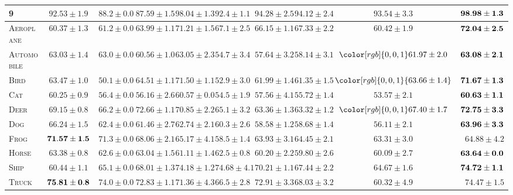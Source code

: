 \begin{table*}[!t]
{\begin{tabular}{lccccccccr}
   9 & $92.53\pm1.9$ & $88.2\pm0.0$ & $87.59\pm1.5$  & $98.04\pm1.3$ & $92.4\pm1.1$ & $94.28\pm2.5$     & $94.12\pm2.4$ & $93.54\pm3.3$ & $\bf{98.98\pm1.3}$\\
   \hline
  \textsc{Aeroplane}    & $60.37\pm1.3$ & $61.2\pm0.0$ & $63.99\pm1.1$  &$71.21\pm1.5$& $67.1\pm2.5$ & $66.15\pm1.1$ & $67.33\pm2.2$ & $60.42\pm1.9$  & $\bf{72.04\pm2.5}$\\
   \textsc{Automobile}  & $63.03\pm1.4$ & $63.0\pm0.0$ & $60.56\pm1.0$  &$63.05\pm2.3$& $54.7\pm3.4 $& $57.64\pm3.2$ & $58.14\pm3.1$ & $\color[rgb]{0,0,1}61.97\pm2.0$  & $\bf{63.08\pm2.1}$\\
   \textsc{Bird}        & $63.47\pm1.0 $& $50.1\pm0.0$ & $64.51\pm1.1$  &$71.50\pm1.1$& $52.9\pm3.0 $& $61.99\pm1.4$ & $61.35\pm1.5$ & $\color[rgb]{0,0,1} {63.66\pm1.4}$ & $\bf{71.67\pm1.3}$\\
   \textsc{Cat}         & $60.25\pm0.9$ & $56.4\pm0.0$ & $56.16\pm2.6$  &$60.57\pm0.0$& $54.5\pm1.9$ & $57.56\pm4.1$ & $55.72\pm1.4$ & $53.57\pm2.1$  & $\bf{60.63\pm1.1}$\\
  \textsc{Deer}         & $69.15\pm0.8$ & $66.2\pm0.0 $& $72.66\pm1.1 $ &$70.85\pm2.2$& $65.1\pm3.2$ & $63.36\pm1.3$ & $63.32\pm1.2$ & $\color[rgb]{0,0,1}67.40\pm1.7 $ & $\bf{72.75\pm3.3}$\\
   \textsc{Dog}         & $66.24\pm1.5$ & $62.4\pm0.0$ & $61.46\pm2.7 $ &$62.74\pm2.1$& $60.3\pm2.6$ & $58.58\pm1.2$ & $58.68\pm1.4$ & $56.11\pm2.1$  & $\bf{63.96\pm3.3}$\\
   \textsc{Frog}        & $\bf{71.57\pm1.5}$ & ${71.3\pm0.0}$ & $68.06\pm2.1 $ &$65.17\pm4.1$& $58.5\pm1.4 $& $63.93\pm3.1 $& $64.45\pm2.1$ & $63.31\pm3.0$  & ${64.88\pm4.2}$\\
   \textsc{Horse}       & $63.38\pm0.8 $& $62.6\pm0.0$ & $63.04\pm1.5$  &$61.11\pm1.4$& $62.5\pm0.8$ & $60.20\pm2.2$ & $59.80\pm2.6$ & $60.09\pm2.7$  &
   $\bf{63.64\pm0.0}$\\
  \textsc{Ship}         & $60.44\pm1.1$ & ${65.1\pm0.0}$ & $68.01\pm1.3$  &$74.18\pm1.2$& $74.68\pm4.1$ & $70.21\pm1.1$ & $67.44\pm2.2$ & $64.67\pm1.6$  & $\bf{74.72\pm1.1}$\\
  \textsc{Truck}        & $\bf{75.81\pm0.8}$ & ${74.0\pm0.0}$ & $72.83\pm1.1$  &$71.36\pm4.3$& $66.5\pm2.8 $& $72.91\pm3.3$ & $68.03\pm3.2$ &$ 60.32\pm4.9 $ & ${74.47\pm1.5}$\\
   \bottomrule[\heavyrulewidth]
   \end{tabular}}
\end{table*}

